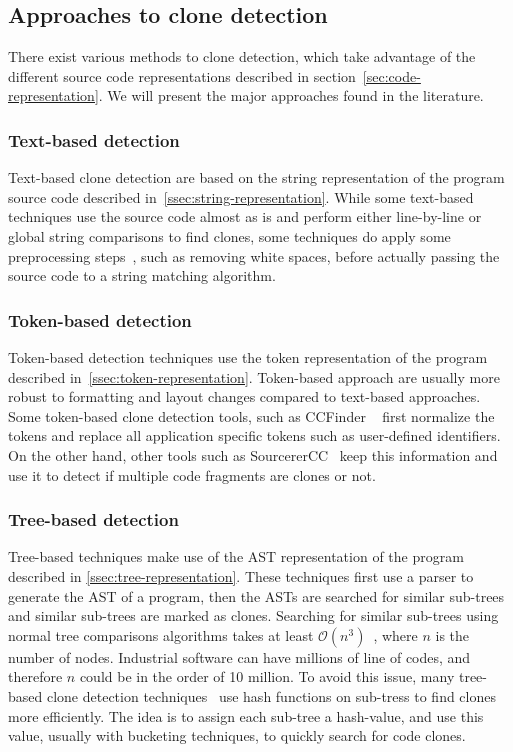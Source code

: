 \subsection{Approaches to clone detection}
There exist various methods to clone detection, which take advantage of the
different source code representations described in
section~\ref{sec:code-representation}. We will present the major
approaches found in the literature.
\subsubsection{Text-based detection}
Text-based clone detection are based on the string representation of the program
source code described in~\ref{ssec:string-representation}.
While some text-based techniques use the source code almost as is and perform
either line-by-line or global string comparisons to find clones, some techniques
do apply some preprocessing steps~\cite{Baker92aprogram}, such as removing white
spaces, before actually passing the source code to a string matching algorithm.
\subsubsection{Token-based detection}
Token-based detection techniques use the token representation of the program
described in~\ref{ssec:token-representation}. Token-based approach are usually
more robust to formatting and layout changes compared to text-based approaches.
Some token-based clone detection tools, such as CCFinder
~\cite{Kamiya:2002:CMT:636188.636191} first normalize the tokens and replace all
application specific tokens such as user-defined identifiers. On the other hand,
other tools such as SourcererCC~\cite{Sajnani:2016:SSC:2884781.2884877} keep
this information and use it to detect if multiple code fragments are clones or
not.
\subsubsection{Tree-based detection}
Tree-based techniques make use of the AST representation of the program
described in \ref{ssec:tree-representation}. These techniques first use a parser
to generate the AST of a program, then the ASTs are searched for similar
sub-trees and similar sub-trees are marked as clones. Searching for similar
sub-trees using normal tree comparisons algorithms takes at least
$\mathcal{O}\left(n^3\right)$~\cite{Baxter:1998:CDU:850947.853341}, where $n$ is
the number of nodes. Industrial software can have millions of line of codes, and
therefore $n$ could be in the order of 10 million. To avoid this issue, many
tree-based clone detection techniques~\cite{Baxter:1998:CDU:850947.853341,
  Jiang:2007:DSA:1248820.1248843} use hash functions on sub-tress to find clones
more efficiently. The idea is to assign each sub-tree a hash-value, and use this
value, usually with bucketing techniques, to quickly search for code clones.
